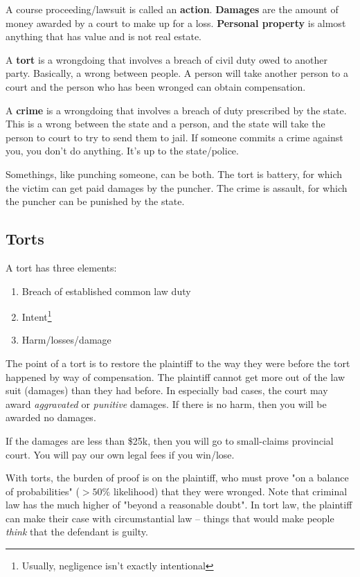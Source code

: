 \documentclass{article}
\begin{document}
A course proceeding/lawsuit is called an \textbf{action}. \textbf{Damages} are the amount of money awarded by a court to make up for a loss. \textbf{Personal property} is almost anything that has value and is not real estate.

A \textbf{tort} is a wrongdoing that involves a breach of civil duty owed to another party. Basically, a wrong between people. A person will take another person to a court and the person who has been wronged can obtain compensation.

A \textbf{crime} is a wrongdoing that involves a breach of duty prescribed by the state. This is a wrong between the state and a person, and the state will take the person to court to try to send them to jail. If someone commits a crime against you, you don't do anything. It's up to the state/police.

Somethings, like punching someone, can be both. The tort is battery, for which the victim can get paid damages by the puncher. The crime is assault, for which the puncher can be punished by the state.

\subsection{Torts}

A tort has three elements: \begin{enumerate}
\item Breach of established common law duty
\item Intent\footnote{Usually, negligence isn't exactly intentional}
\item Harm/losses/damage
\end{enumerate}

The point of a tort is to restore the plaintiff to the way they were before the tort happened by way of compensation. The plaintiff cannot get more out of the law suit (damages) than they had before. In especially bad cases, the court may award \textit{aggravated} or \textit{punitive} damages. If there is no harm, then you will be awarded no damages.

If the damages are less than \$25k, then you will go to small-claims provincial court. You will pay our own legal fees if you win/lose.

With torts, the burden of proof is on the plaintiff, who must prove "on a balance of probabilities" ($> 50\%$ likelihood) that they were wronged. Note that criminal law has the much higher of "beyond a reasonable doubt". In tort law, the plaintiff can make their case with circumstantial law -- things that would make people  \textit{think} that the defendant is guilty.
\end{document}
